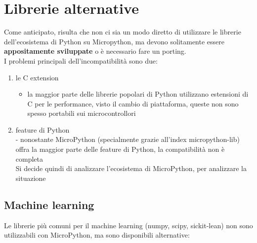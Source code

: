 \documentclass[12pt,a4paper]{report}
\begin{document}
\section{Librerie alternative}

Come anticipato, risulta che non ci sia un modo diretto di utilizzare
le librerie dell'ecosistema di Python su Micropython, ma
devono solitamente essere \textbf{appositamente sviluppate} o è
necessario fare un porting.\\
I problemi principali dell'incompatibilità sono due:

\begin{enumerate}
\item
  le C extension

  \begin{itemize}
    \item
    la maggior parte delle librerie popolari di Python utilizzano
    estensioni di C per le performance, visto il cambio di piattaforma,
    queste non sono spesso portabili sui microcontrollori
  \end{itemize}
\item
  feature di Python\\
  - nonostante MicroPython (specialmente grazie
  all'index micropython-lib) offra la maggior parte
  delle feature di Python, la compatibilità non è completa\\
  Si decide quindi di analizzare l'ecosistema di
  MicroPython, per analizzare la situazione
\end{enumerate}

\subsection{Machine learning}\label{machine-learning}

Le librerie più comuni per il machine learning (numpy, scipy,
sickit-lean) non sono utilizzabili con MicroPython, ma sono disponibili
alternative:
\end{document}
